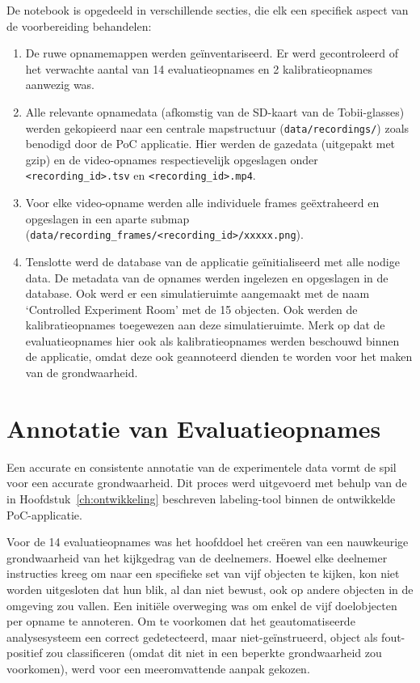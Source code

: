 De notebook is opgedeeld in verschillende secties, die elk een specifiek aspect van de voorbereiding behandelen:
\begin{enumerate}
    \item De ruwe opnamemappen werden geïnventariseerd. Er werd gecontroleerd of het verwachte aantal van 14 evaluatieopnames 
    en 2 kalibratieopnames aanwezig was.
    \item Alle relevante opnamedata (afkomstig van de SD-kaart van de Tobii-glasses) werden gekopieerd naar een centrale 
    mapstructuur (\texttt{data/recordings/}) zoals benodigd door de PoC applicatie.
    Hier werden de gazedata (uitgepakt met gzip) en de video-opnames respectievelijk opgeslagen onder \texttt{<recording\_id>.tsv} 
    en \texttt{<recording\_id>.mp4}.
    \item Voor elke video-opname werden alle individuele frames geëxtraheerd en opgeslagen 
    in een aparte submap (\texttt{data/recording\_frames/<recording\_id>/xxxxx.png}).
    \item Tenslotte werd de database van de applicatie geïnitialiseerd met alle nodige data. De metadata van de opnames werden 
    ingelezen en opgeslagen in de database.
    Ook werd er een simulatieruimte aangemaakt met de naam `Controlled Experiment Room' met de 15 objecten. Ook werden de kalibratieopnames toegewezen aan deze simulatieruimte.
    Merk op dat de evaluatieopnames hier ook als kalibratieopnames werden beschouwd binnen de applicatie, omdat deze ook geannoteerd 
    dienden te worden voor het maken van de grondwaarheid.
\end{enumerate}

\section{Annotatie van Evaluatieopnames}


Een accurate en consistente annotatie van de experimentele data vormt de spil voor een accurate grondwaarheid.
Dit proces werd uitgevoerd met behulp van de in Hoofdstuk~\ref{ch:ontwikkeling} beschreven labeling-tool binnen de ontwikkelde PoC-applicatie. 

Voor de 14 evaluatieopnames was het hoofddoel het creëren van een nauwkeurige grondwaarheid van het kijkgedrag van de deelnemers. 
Hoewel elke deelnemer instructies kreeg om naar een specifieke set van vijf objecten te kijken, kon niet worden uitgesloten dat hun blik, 
al dan niet bewust, ook op andere objecten in de omgeving zou vallen. 
Een initiële overweging was om enkel de vijf doelobjecten per opname te annoteren. 
Om te voorkomen dat het geautomatiseerde analysesysteem een correct gedetecteerd, maar niet-geïnstrueerd, 
object als fout-positief zou classificeren (omdat dit niet in een beperkte grondwaarheid zou voorkomen), 
werd voor een meeromvattende aanpak gekozen.

